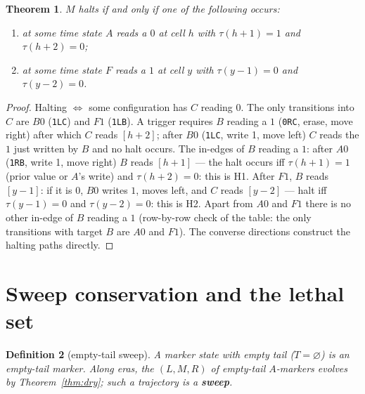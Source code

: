 \documentclass[11pt]{amsart}
\newtheorem{theorem}{Theorem}[section]
\newtheorem{definition}[theorem]{Definition}
\begin{document}
\begin{theorem}\label{thm:H}
$M$ halts if and only if one of the following occurs:
\begin{enumerate}
\item[\textbf{(H1)}] at some time state $A$ reads a $0$ at cell $h$ with $\tau(h{+}1)=1$ and $\tau(h{+}2)=0$;
\item[\textbf{(H2)}] at some time state $F$ reads a $1$ at cell $y$ with $\tau(y{-}1)=0$ and $\tau(y{-}2)=0$.
\end{enumerate}
\end{theorem}
\begin{proof}
Halting $\iff$ some configuration has $C$ reading $0$. The only transitions into $C$ are $B0$ (\texttt{1LC}) and $F1$ (\texttt{1LB}).
A trigger requires $B$ reading a $1$ (\texttt{0RC}, erase, move right) after which $C$ reads $[h{+}2]$; after $B0$ (\texttt{1LC}, write 1, move left) $C$ reads the $1$ just written by $B$ and no halt occurs. The in-edges of $B$ reading a $1$: after $A0$ (\texttt{1RB}, write 1, move right) $B$ reads $[h{+}1]$ --- the halt occurs iff $\tau(h{+}1)=1$ (prior value or $A$'s write) and $\tau(h{+}2)=0$: this is H1. After $F1$, $B$ reads $[y{-}1]$: if it is $0$, $B0$ writes $1$, moves left, and $C$ reads $[y{-}2]$ --- halt iff $\tau(y{-}1)=0$ and $\tau(y{-}2)=0$: this is H2. Apart from $A0$ and $F1$ there is no other in-edge of $B$ reading a $1$ (row-by-row check of the table: the only transitions with target $B$ are $A0$ and $F1$). The converse directions construct the halting paths directly.
\end{proof}

\section{Sweep conservation and the lethal set}

\begin{definition}[empty-tail sweep]
A marker state with empty tail ($T=\varnothing$) is an empty-tail marker. Along eras, the $(L,M,R)$ of empty-tail $A$-markers evolves by Theorem~\ref{thm:dry}; such a trajectory is a \textbf{sweep}.
\end{definition}
\end{document}
